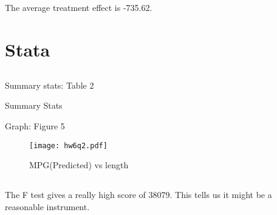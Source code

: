 \documentclass{article}
\begin{document}
\subsection{}
The average treatment effect is -735.62. 

\section{Stata}

\subsection{}
Summary stats: Table 2
\begin{table}[ht]
    \centering
    
    \caption{Summary Stats}
    \label{tab:my_label}
\end{table}


Graph: Figure 5
\begin{figure}[ht]
    \centering
    \texttt{[image: hw6q2.pdf]}
    \caption{MPG(Predicted) vs length}
    \label{fig:my_label}
\end{figure}

\subsection{}
The F test gives a really high score of 38079. This tells us it might be a reasonable instrument. 
\end{document}
